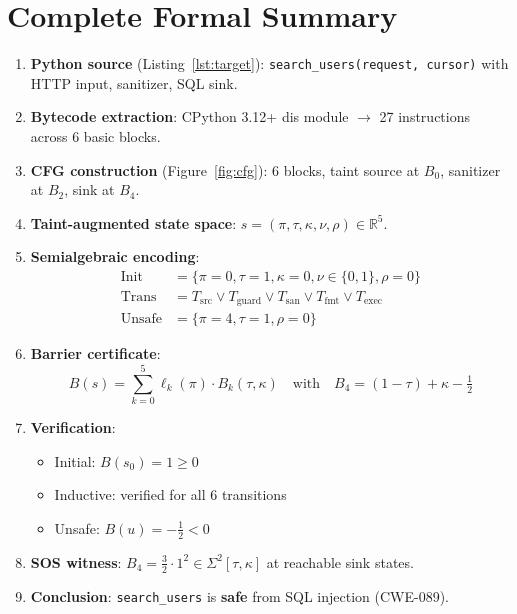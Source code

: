 \documentclass[11pt,a4paper]{article}
\theoremstyle{plain}
\theoremstyle{definition}
\theoremstyle{remark}
\newcommand{\R}{\mathbb{R}}
\newcommand{\Init}{\operatorname{Init}}
\newcommand{\Trans}{\operatorname{Trans}}
\newcommand{\Unsafe}{\operatorname{Unsafe}}
\begin{document}
\section{Complete Formal Summary}
\label{sec:summary}

\begin{pipelinebox}
\begin{enumerate}[leftmargin=*]
\item \textbf{Python source} (Listing~\ref{lst:target}):
  \texttt{search\_users(request, cursor)} with HTTP input, sanitizer, SQL sink.

\item \textbf{Bytecode extraction}: CPython 3.12+ dis module $\to$
  27 instructions across 6 basic blocks.

\item \textbf{CFG construction} (Figure~\ref{fig:cfg}): 6 blocks,
  taint source at $B_0$, sanitizer at $B_2$, sink at $B_4$.

\item \textbf{Taint-augmented state space}:
  $s = (\pi, \tau, \kappa, \nu, \rho) \in \R^5$.

\item \textbf{Semialgebraic encoding}:
  \begin{align*}
    \Init &= \{\pi=0, \tau=1, \kappa=0, \nu\in\{0,1\}, \rho=0\} \\
    \Trans &= T_{\text{src}} \vee T_{\text{guard}} \vee
      T_{\text{san}} \vee T_{\text{fmt}} \vee T_{\text{exec}} \\
    \Unsafe &= \{\pi=4, \tau=1, \rho=0\}
  \end{align*}

\item \textbf{Barrier certificate}:
  \[
    B(s) = \sum_{k=0}^{5} \ell_k(\pi) \cdot B_k(\tau, \kappa)
    \quad\text{with}\quad
    B_4 = (1-\tau) + \kappa - \tfrac{1}{2}
  \]

\item \textbf{Verification}:
  \begin{itemize}[nosep]
    \item Initial: $B(s_0) = 1 \geq 0$ \checkmark
    \item Inductive: verified for all 6 transitions \checkmark
    \item Unsafe: $B(u) = -\tfrac{1}{2} < 0$ \checkmark
  \end{itemize}

\item \textbf{SOS witness}: $B_4 = \tfrac{3}{2} \cdot 1^2 \in
  \Sigma^2[\tau,\kappa]$ at reachable sink states.

\item \textbf{Conclusion}: \texttt{search\_users} is \textbf{safe}
  from SQL injection (CWE-089).
\end{enumerate}
\end{pipelinebox}
\end{document}
